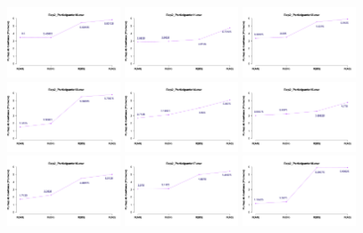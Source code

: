 \begin{figure}[th]
\includegraphics[width=0.30\textwidth]{Figures/MirrorRating_Exp2_P10} \includegraphics[width=0.30\textwidth]{Figures/MirrorRating_Exp2_P11} \includegraphics[width=0.30\textwidth]{Figures/MirrorRating_Exp2_P12}
\includegraphics[width=0.30\textwidth]{Figures/MirrorRating_Exp2_P13} \includegraphics[width=0.30\textwidth]{Figures/MirrorRating_Exp2_P14} \includegraphics[width=0.30\textwidth]{Figures/MirrorRating_Exp2_P15}
\includegraphics[width=0.30\textwidth]{Figures/MirrorRating_Exp2_P16} \includegraphics[width=0.30\textwidth]{Figures/MirrorRating_Exp2_P17} \includegraphics[width=0.30\textwidth]{Figures/MirrorRating_Exp2_P18}

\end{figure}
